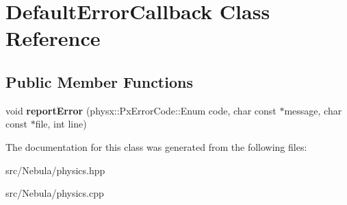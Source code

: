 \hypertarget{classDefaultErrorCallback}{\section{\-Default\-Error\-Callback \-Class \-Reference}
\label{classDefaultErrorCallback}
}
\subsection*{\-Public \-Member \-Functions}
\begin{DoxyCompactItemize}
\item 
\hypertarget{classDefaultErrorCallback_ae95118f6a45b47a1b72af9417f80d84e}{void {\bfseries report\-Error} (physx\-::\-Px\-Error\-Code\-::\-Enum code, char const $\ast$message, char const $\ast$file, int line)}\label{classDefaultErrorCallback_ae95118f6a45b47a1b72af9417f80d84e}

\end{DoxyCompactItemize}


\-The documentation for this class was generated from the following files\-:\begin{DoxyCompactItemize}
\item 
src/\-Nebula/physics.\-hpp\item 
src/\-Nebula/physics.\-cpp\end{DoxyCompactItemize}
